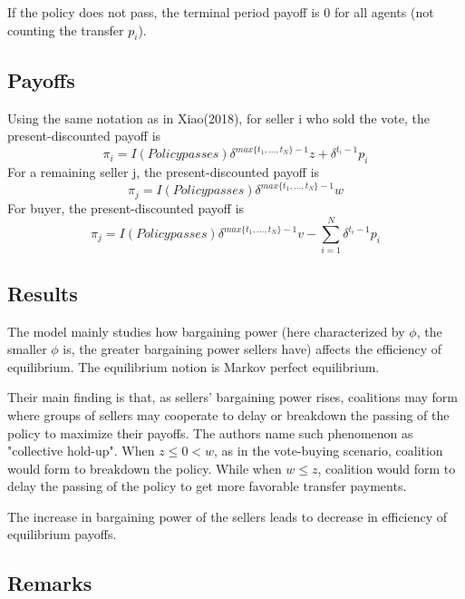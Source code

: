 \documentclass[ProjectGAZ]{subfiles}
\begin{document}
If the policy does not pass, the terminal period payoff is 0 for all agents (not counting the transfer $p_i$).

\subsection{Payoffs}\label{subsec:InO-Payoffs}

Using the same notation as in Xiao(2018), for seller i who sold the vote, the present-discounted payoff is
\begin{equation}
	\pi_i = I(Policy passes)\delta^{max\{t_1, ..., t_N\} - 1} z + \delta^{t_i-1}p_i 
\end{equation}
For a remaining seller j, the present-discounted payoff is 
\begin{equation}
	\pi_j =  I(Policy passes)\delta^{max\{t_1, ..., t_N\} - 1} w
\end{equation}
For buyer, the present-discounted payoff is 
\begin{equation}
	\pi_j =  I(Policy passes)\delta^{max\{t_1, ..., t_N\} - 1} v - \sum_{i=1}^{N}\delta^{t_i-1}p_i
\end{equation}

\subsection{Results}\label{subsec:InO-Results}

The model mainly studies how bargaining power (here characterized by $\phi$, the smaller $\phi$ is, the greater bargaining power sellers have) affects the efficiency of equilibrium. The equilibrium notion is Markov perfect equilibrium.

Their main finding is that, as sellers' bargaining power rises, coalitions may form where groups of sellers may cooperate to delay or breakdown the passing of the policy to maximize their payoffs. The authors name such phenomenon as "collective hold-up". When $z \leq 0 < w$, as in the vote-buying scenario, coalition would form to breakdown the policy. While when $w \leq z$, coalition would form to delay the passing of the policy to get more favorable transfer payments.

The increase in bargaining power of the sellers leads to decrease in efficiency of equilibrium payoffs.


\subsection{Remarks}\label{subsec:InO-Remarks}
\end{document}
